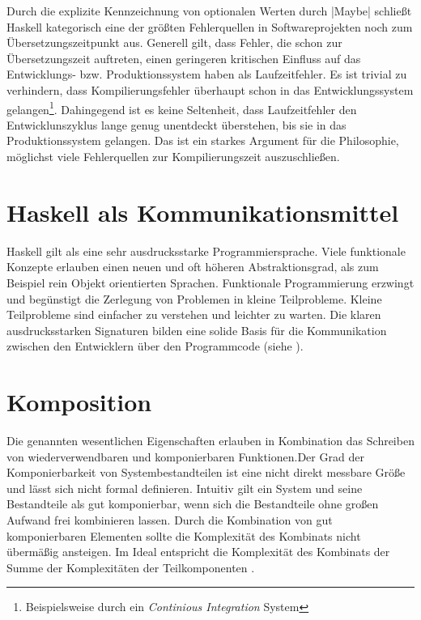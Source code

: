 Durch die explizite Kennzeichnung von optionalen Werten durch |Maybe| schließt Haskell kategorisch eine der größten Fehlerquellen in Softwareprojekten noch zum Übersetzungszeitpunkt aus. Generell gilt, dass Fehler, die schon zur Übersetzungszeit auftreten, einen geringeren kritischen Einfluss auf das Entwicklungs- bzw. Produktionssystem haben als Laufzeitfehler. Es ist trivial zu verhindern, dass Kompilierungsfehler überhaupt schon in das Entwicklungssystem gelangen\footnote{Beispielsweise durch ein \textit{Continious Integration} System}. Dahingegend ist es keine Seltenheit, dass Laufzeitfehler den Entwicklunszyklus lange genug unentdeckt überstehen, bis sie in das Produktionssystem gelangen. Das ist ein starkes Argument für die Philosophie, möglichst viele Fehlerquellen zur Kompilierungszeit auszuschließen.

\section{Haskell als Kommunikationsmittel}

Haskell gilt als eine sehr ausdrucksstarke Programmiersprache. Viele funktionale Konzepte erlauben einen neuen und oft höheren Abstraktionsgrad, als zum Beispiel rein Objekt orientierten Sprachen. Funktionale Programmierung erzwingt und begünstigt die Zerlegung von Problemen in kleine Teilprobleme. Kleine Teilprobleme sind einfacher zu verstehen und leichter zu warten. Die klaren ausdrucksstarken Signaturen bilden eine solide Basis für die Kommunikation zwischen den Entwicklern über den Programmcode (siehe ).

\section{Komposition}

Die genannten wesentlichen Eigenschaften erlauben in Kombination das Schreiben von wiederverwendbaren und komponierbaren Funktionen.Der Grad der Komponierbarkeit von Systembestandteilen ist eine nicht direkt messbare Größe und lässt sich nicht formal definieren. Intuitiv gilt ein System und seine Bestandteile als gut komponierbar, wenn sich die Bestandteile ohne großen Aufwand frei kombinieren lassen. Durch die Kombination von gut komponierbaren Elementen sollte die Komplexität des Kombinats nicht übermäßig ansteigen. Im Ideal entspricht die Komplexität des Kombinats der Summe der Komplexitäten der Teilkomponenten \parencite[Seite 19]{Blackheath2013}.

